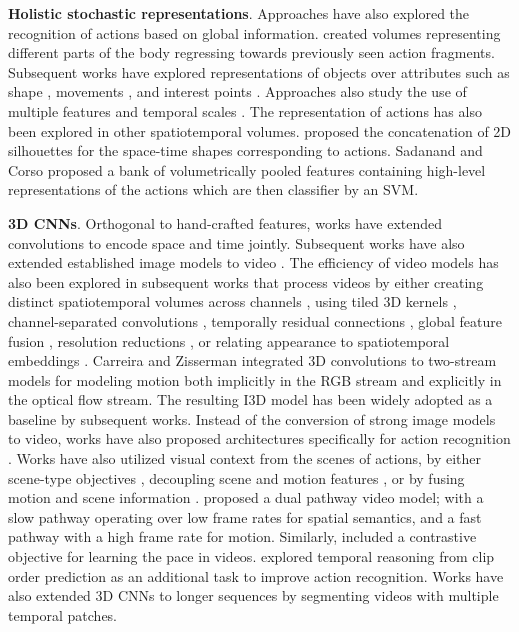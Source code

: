 \documentclass[smallextended,twocolumn,natbib]{svjour3}
\begin{document}
\noindent
\textbf{Holistic stochastic representations}. Approaches have also explored the recognition of actions based on global information. \citet{efros2003recognizing} created volumes representing different parts of the body regressing towards previously seen action fragments. Subsequent works have explored representations of objects over attributes such as shape \citep{gorelick2006shape,jia2008human}, movements \citep{sun2009action}, and interest points \citep{wong2007extracting}. Approaches also study the use of multiple features and temporal scales \citep{amer2012sum,liu2008recognizing,zelnik2001event,yang2020temporal}. The representation of actions has also been explored in other spatiotemporal volumes. \citet{blank2005actions} proposed the concatenation of 2D silhouettes for the space-time shapes corresponding to actions. Sadanand and Corso \citep{sadanand2012action} proposed a bank of volumetrically pooled features containing high-level representations of the actions which are then classifier by an SVM.


\noindent
\textbf{3D CNNs}. Orthogonal to hand-crafted features, works \citep{baccouche2011sequential,ji20123d,taylor2010convolutional,tran2015learning} have extended convolutions to encode space and time jointly. Subsequent works have also extended established image models to video \citep{hara2018can}. The efficiency of video models has also been explored in subsequent works that process videos by either creating distinct spatiotemporal volumes across channels \citep{chen2018multi}, using tiled 3D kernels \citep{hegde2018morph}, channel-separated convolutions \citep{jiang2019stm,luo2019grouped,tran2019video}, temporally residual connections \citep{qiu2017learning}, global feature fusion \citep{qiu2019learning}, resolution reductions \citep{chen2019drop,stergiou2021multi}, or relating appearance to spatiotemporal  embeddings \citep{wang2018appearance,zhou2018mict}. Carreira and Zisserman \citep{carreira2017quo} integrated 3D convolutions to two-stream models for modeling motion both implicitly in the RGB stream and explicitly in the optical flow stream. The resulting I3D model has been widely adopted as a baseline by subsequent works. Instead of the conversion of strong image models to video, works have also proposed architectures specifically for action recognition \citep{feichtenhofer2020x3d,kondratyuk2021movinets,liu2022convnet}. Works have also utilized visual context from the scenes of actions, by either scene-type objectives \citep{choi2019can}, decoupling scene and motion features \citep{wang2021enhancing}, or by fusing motion and scene information \citep{stergiou2021learn}. \citet{feichtenhofer2019slowfast} proposed a dual pathway video model; with a slow pathway operating over low frame rates for spatial semantics, and a fast pathway with a high frame rate for motion. Similarly, \citet{wang2020self} included a contrastive objective for learning the pace in videos. \citet{xu2019self} explored temporal reasoning from clip order prediction as an additional task to improve action recognition. Works \citep{ji2020action,hussein2019timeception,varol2017long} have also extended 3D CNNs to longer sequences by segmenting videos with multiple temporal patches.
\end{document}
